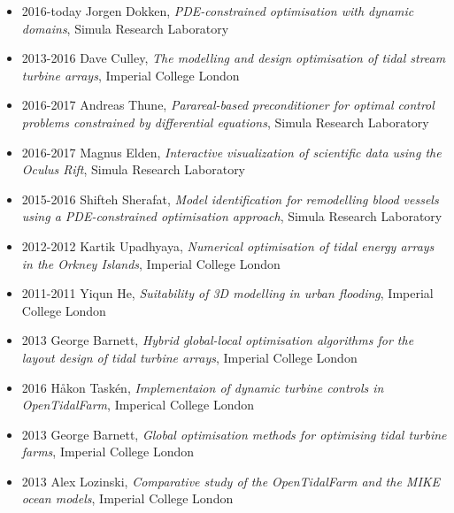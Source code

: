 \documentclass[11pt]{article}
\newenvironment{outerlist}[1][\enskip\textbullet]
        {\begin{itemize}[ #1]}{\end{itemize}}
\begin{document}


\begin{outerlist}
    \item[2016-today] J\/orgen Dokken, \textit{PDE-constrained optimisation with dynamic domains}, Simula Research Laboratory
    \item[2013-2016] Dave Culley, \textit{The modelling and design optimisation of tidal stream turbine arrays}, Imperial College London
\end{outerlist}

\begin{outerlist}
    \item[2016-2017] Andreas Thune, \textit{Parareal-based preconditioner for optimal control problems constrained by differential equations}, Simula Research Laboratory
    \item[2016-2017] Magnus Elden, \textit{Interactive visualization of scientific data using the Oculus Rift}, Simula Research Laboratory
    \item[2015-2016] Shifteh Sherafat, \textit{Model identification for remodelling blood vessels using a PDE-constrained optimisation approach}, Simula Research Laboratory
    \item[2012-2012] Kartik Upadhyaya, \textit{Numerical optimisation of tidal energy arrays in the Orkney Islands}, Imperial College London
    \item[2011-2011] Yiqun He, \textit{Suitability of 3D modelling in urban flooding}, Imperial College London
\end{outerlist}

\begin{outerlist}
    \item[2013] George Barnett, \textit{Hybrid global-local optimisation algorithms for the layout design of tidal turbine arrays}, Imperial College London
\end{outerlist}

\begin{outerlist}
    \item[2016] H{\aa}kon Task{\'e}n, \textit{Implementaion of dynamic turbine controls in OpenTidalFarm}, Imperical College London
    \item[2013] George Barnett, \textit{Global optimisation methods for optimising tidal turbine farms}, Imperial College London
    \item[2013] Alex Lozinski, \textit{Comparative study of the OpenTidalFarm and the MIKE ocean models}, Imperial College London
\end{outerlist}
\end{document}
